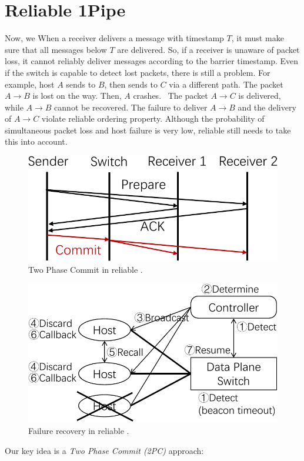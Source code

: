 \section{Reliable 1Pipe}
\label{sec:reliable}

Now, we 
When a receiver delivers a message with timestamp $T$, it must make sure that all messages below $T$ are delivered.
So, if a receiver is unaware of packet loss, it cannot reliably deliver messages according to the barrier timestamp.
Even if the switch is capable to detect lost packets, there is still a problem. %
For example, host $A$ sends to $B$, then sends to $C$ via a different path. The packet $A \rightarrow B$ is lost on the way. Then, $A$ crashes.~ The packet $A \rightarrow C$ is delivered, while $A \rightarrow B$ cannot be recovered. The failure to deliver $A \rightarrow B$ and the delivery of $A \rightarrow C$ violate reliable ordering property.
Although the probability of simultaneous packet loss and host failure is very low, reliable \sys{} still needs to take this into account.


\begin{figure}[t]
\centering
	\includegraphics[width=.3\textwidth]{images/2PC.pdf}
	\caption{Two Phase Commit in reliable \sys{}.~}
	\label{fig:2PC}
\end{figure}

\begin{figure}[t]
	\centering
	\includegraphics[width=.35\textwidth]{images/failure_recovery.pdf}
	\caption{Failure recovery in reliable \sys{}.}
	\label{fig:failure_recovery}
\end{figure}

Our key idea is a \emph{Two Phase Commit (2PC)} approach:~

